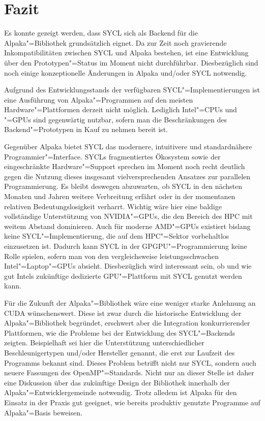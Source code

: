 \chapter{Fazit}
\label{fazit}

Es konnte gezeigt werden, dass SYCL sich als Backend für die Alpaka"=Bibliothek
grundsätzlich eignet. Da zur Zeit noch gravierende Inkompatibilitäten zwischen
SYCL und Alpaka bestehen, ist eine Entwicklung über den Prototypen"=Status
im Moment nicht durchführbar. Diesbezüglich sind noch einige konzeptionelle
Änderungen in Alpaka und/oder SYCL notwendig.

Aufgrund des Entwicklungsstands der verfügbaren SYCL"=Implementierungen ist eine
Ausführung von Alpaka"=Programmen auf den meisten Hardware"=Plattformen derzeit
nicht möglich. Lediglich Intel"=CPUs und "=GPUs sind gegenwärtig nutzbar, sofern
man die Beschränkungen des Backend"=Prototypen in Kauf zu nehmen bereit ist.

Gegenüber Alpaka bietet SYCL das modernere, intuitivere und standardnähere
Programmier"=Interface. SYCLs fragmentiertes Ökosystem sowie der eingeschränkte
Hardware"=Support sprechen im Moment noch recht deutlich gegen die Nutzung
dieses insgesamt vielversprechenden Ansatzes zur parallelen Programmierung. Es
bleibt deswegen abzuwarten, ob SYCL in den nächsten Monaten und Jahren weitere
Verbreitung erfährt oder in der momentanen relativen Bedeutungslosigkeit
verharrt. Wichtig wäre hier eine baldige vollständige Unterstützung von
NVIDIA"=GPUs, die den Bereich des HPC mit weitem Abstand dominieren. Auch für
moderne AMD"=GPUs existiert bislang keine SYCL"=Implementierung, die auf dem
HPC"=Sektor vorbehaltlos einzusetzen ist. Dadurch kann SYCL in der
GPGPU"=Programmierung keine Rolle spielen, sofern man von den vergleichsweise
leistungsschwachen Intel"=Laptop"=GPUs absieht. Diesbezüglich wird interessant
sein, ob und wie gut Intels zukünftige dedizierte GPU"=Plattform mit SYCL
genutzt werden kann.

Für die Zukunft der Alpaka"=Bibliothek wäre eine weniger starke Anlehnung an
CUDA wünschenswert. Diese ist zwar durch die historische Entwicklung der
Alpaka"=Bibliothek begründet, erschwert aber die Integration konkurrierender
Plattformen, wie die Probleme bei der Entwicklung des SYCL"=Backends zeigten.
Beispielhaft sei hier die Unterstützung unterschiedlicher Beschleunigertypen
und/oder Hersteller genannt, die erst zur Laufzeit des Programms bekannt sind.
Dieses Problem betrifft nicht nur SYCL, sondern auch neuere Fassungen des
OpenMP"=Standards. Nicht nur an dieser Stelle ist daher eine Diskussion über das
zukünftige Design der Bibliothek innerhalb der Alpaka"=Entwicklergemeinde
notwendig. Trotz alledem ist Alpaka für den Einsatz in der Praxis gut geeignet,
wie bereits produktiv genutzte Programme auf Alpaka"=Basis beweisen.

